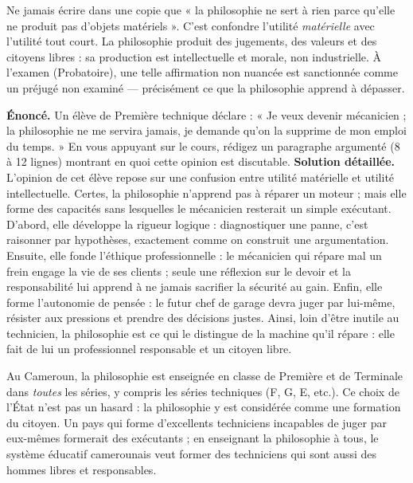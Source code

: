 \documentclass[11pt]{article}
\newcommand{\cle}[1]{{\popxbold\color{popdark}#1}}
\begin{document}
\begin{attention}
Ne jamais écrire dans une copie que « la philosophie ne sert à rien parce qu'elle ne produit pas d'objets matériels ». C'est confondre l'utilité \emph{matérielle} avec l'utilité tout court. La philosophie produit des \cle{jugements}, des \cle{valeurs} et des \cle{citoyens libres} : sa production est intellectuelle et morale, non industrielle. À l'examen (Probatoire), une telle affirmation non nuancée est sanctionnée comme un préjugé non examiné — précisément ce que la philosophie apprend à dépasser.
\end{attention}

\begin{exoresolu}
\textbf{Énoncé.} Un élève de Première technique déclare : « Je veux devenir mécanicien ; la philosophie ne me servira jamais, je demande qu'on la supprime de mon emploi du temps. » En vous appuyant sur le cours, rédigez un paragraphe argumenté (8 à 12 lignes) montrant en quoi cette opinion est discutable.
\tcblower
\textbf{Solution détaillée.} L'opinion de cet élève repose sur une confusion entre utilité matérielle et utilité intellectuelle. Certes, la philosophie n'apprend pas à réparer un moteur ; mais elle forme des capacités sans lesquelles le mécanicien resterait un simple exécutant. D'abord, elle développe la rigueur logique : diagnostiquer une panne, c'est raisonner par hypothèses, exactement comme on construit une argumentation. Ensuite, elle fonde l'éthique professionnelle : le mécanicien qui répare mal un frein engage la vie de ses clients ; seule une réflexion sur le devoir et la responsabilité lui apprend à ne jamais sacrifier la sécurité au gain. Enfin, elle forme l'autonomie de pensée : le futur chef de garage devra juger par lui-même, résister aux pressions et prendre des décisions justes. Ainsi, loin d'être inutile au technicien, la philosophie est ce qui le distingue de la machine qu'il répare : elle fait de lui un professionnel responsable et un citoyen libre.
\end{exoresolu}

\begin{savaistu}[Le savais-tu ?]
Au Cameroun, la philosophie est enseignée en classe de Première et de Terminale dans \emph{toutes} les séries, y compris les séries techniques (F, G, E, etc.). Ce choix de l'État n'est pas un hasard : la philosophie y est considérée comme une \cle{formation du citoyen}. Un pays qui forme d'excellents techniciens incapables de juger par eux-mêmes formerait des exécutants ; en enseignant la philosophie à tous, le système éducatif camerounais veut former des techniciens qui sont aussi des hommes libres et responsables.
\end{savaistu}
\end{document}
